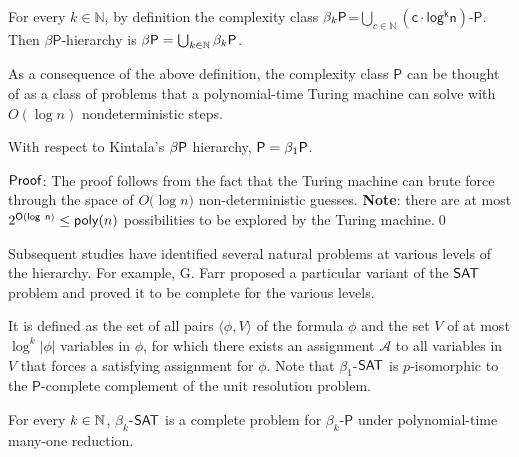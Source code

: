 \documentclass[11pt]{article}
\begin{document}
\begin{definition}
     For every $k\in \mathbb{N}$, by definition the complexity class $\beta_k\P$=$\bigcup_{c\in \mathbb{N}} \mathsf{(c\cdot log^{k}n)}$-$\mathsf{P}$. Then $\beta$$\mathsf{P}$-hierarchy is $\beta \P= \bigcup_{k\in \N} \beta_k \P$.
\end{definition}
As a consequence of the above definition, the complexity class $\mathsf{P}$ can be thought of as a class of problems that a polynomial-time Turing machine can solve with $O(\log n)$ nondeterministic steps.
\begin{theorem}
     With respect to Kintala's $\beta \P$ hierarchy, $\P=\beta_1\P$. 
\end{theorem}
$\Proof$: The proof follows from the fact that the Turing machine can brute force through the space of ${O(\log} n)$ non-deterministic guesses. \textbf{Note}: there are at most $2^{\mathsf{O(log\ n)}}\leq \poly(n)$ possibilities to be explored by the Turing machine.\qed

Subsequent studies have identified several natural problems at various levels of the hierarchy. For example, G. Farr proposed a particular variant of the $\SAT$ problem and proved it to be complete for the various levels. 
\begin{prob}
     It is defined as the set of all pairs $\langle \phi, V\rangle$ of the formula $\phi$ and the set $V$ of at most $\log^k|\phi|$ variables in $\phi$, for which there exists an assignment $\mathcal{A}$ to all variables in $V$ that forces a satisfying assignment for $\phi$. Note that $\beta_1$-$\SAT$ is $p$-isomorphic to the $\mathsf{P}$-complete complement of the unit resolution problem.
\end{prob}
\begin{theorem}
     For every $k\in \N$, $\beta_k$-$\SAT$ is a complete problem for $\beta_k$-$\mathsf{P}$ under polynomial-time many-one reduction.
\end{theorem}

\end{document}
